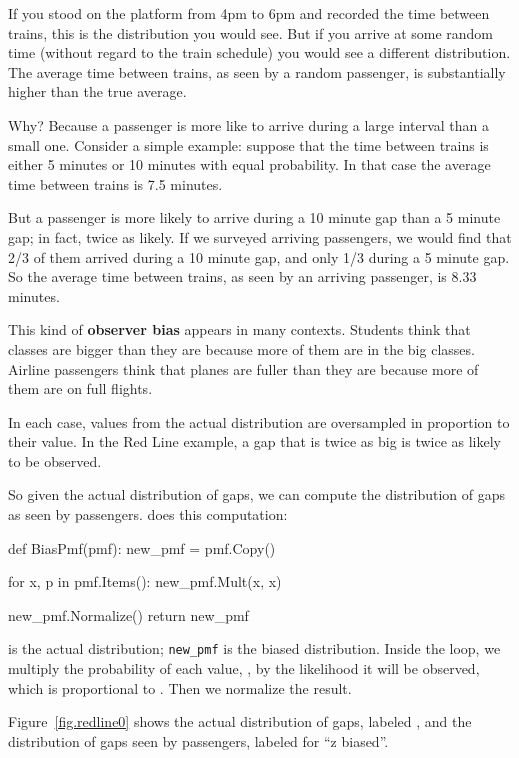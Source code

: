 \documentclass[12pt]{book}
\theoremstyle{exercise}
\begin{document}
If you stood on the platform from 4pm to 6pm and recorded the time
between trains, this is the distribution you would see.  But if you
arrive at some random time (without regard to the train schedule) you
would see a different distribution.  The average time
between trains, as seen by a random passenger, is substantially
higher than the true average.

Why?  Because a passenger is more like to arrive during a
large interval than a small one.  Consider a simple example:
suppose that the time between trains is either 5 minutes
or 10 minutes with equal probability.  In that case
the average time between
trains is 7.5 minutes.

But a passenger is more likely to arrive during a 10 minute gap 
than a 5 minute gap; in fact, twice as likely.  If we surveyed
arriving passengers, we would find that 2/3 of them arrived during
a 10 minute gap, and only 1/3 during a 5 minute gap.  So the
average time between trains, as seen by an arriving passenger,
is 8.33 minutes.

This kind of {\bf observer bias} appears in many contexts.  Students
think that classes are bigger than they are because more of them are
in the big classes.  Airline passengers think that planes are fuller
than they are because more of them are on full flights.

In each case, values from the actual distribution are
oversampled in proportion to their value.  In the Red Line example,
a gap that is twice as big is twice as likely to be observed.

So given the actual distribution of gaps, we can compute the
distribution of gaps as seen by passengers.  
does this computation:

\begin{code}
def BiasPmf(pmf):
    new_pmf = pmf.Copy()

    for x, p in pmf.Items():
        new_pmf.Mult(x, x)
        
    new_pmf.Normalize()
    return new_pmf
\end{code}

 is the actual distribution; \verb"new_pmf" is the
biased distribution.  Inside the loop, we multiply the
probability of each value, , by the likelihood it will
be observed, which is proportional to .  Then we
normalize the result.

Figure~\ref{fig.redline0} shows the actual distribution of gaps,
labeled , and the distribution of gaps seen by passengers,
labeled  for ``z biased''.
\end{document}
